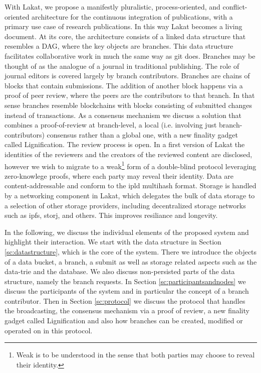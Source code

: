 \documentclass[14pt]{article}
\begin{document}
With Lakat, we propose a manifestly pluralistic, process-oriented, and conflict-oriented architecture for the continuous integration of publications, with a primary use case of research publications. In this way Lakat becomes a living document. At its core, the architecture consists of a linked data structure that resembles a DAG, where the key objects are branches. This data structure facilitates collaborative work in much the same way as git does. Branches may be thought of as the analogue of a journal in traditional publishing. The role of journal editors is covered largely by branch contributors. Branches are chains of blocks that contain submissions. The addition of another block happens via a proof of peer review, where the peers are the contributors to that branch. In that sense branches resemble blockchains with blocks consisting of submitted changes instead of transactions. As a consensus mechanism we discuss a solution that combines a proof-of-review at branch-level, a local (i.e. involving just branch-contributors) consensus rather than a global one, with a new finality gadget called Lignification. The review process is open. In a first version of Lakat the identities of the reviewers and the creators of the reviewed content are disclosed, however we wish to migrate to a weak\footnote{Weak is to be understood in the sense that both parties may choose to reveal their identity.} form of a double-blind protocol leveraging zero-knowlege proofs, where each party may reveal their identity.
Data are content-addressable and conform to the ipld multihash format. Storage is handled by a networking component in Lakat, which delegates the bulk of data storage to a selection of other storage providers, including decentralized storage networks such as ipfs, storj, and others. This improves resiliance and longevity. 

In the following, we discuss the individual elements of the proposed system and highlight their interaction. We start with the data structure in Section \ref{sc:datastructure}, which is the core of the system. There we introduce the objects of a data bucket, a branch, a submit as well as storage related aspects such as the data-trie and the database. We also discuss non-persisted parts of the data structure, namely the branch requests. In Section \ref{sc:participantsandnodes} we discuss the participants of the system and in particular the concept of a branch contributor. Then in Section \ref{sc:protocol} we discuss the protocol that handles the broadcasting, the consensus mechanism via a proof of review, a new finality gadget called Lignification and also how branches can be created, modified or operated on in this protocol. 
\end{document}
